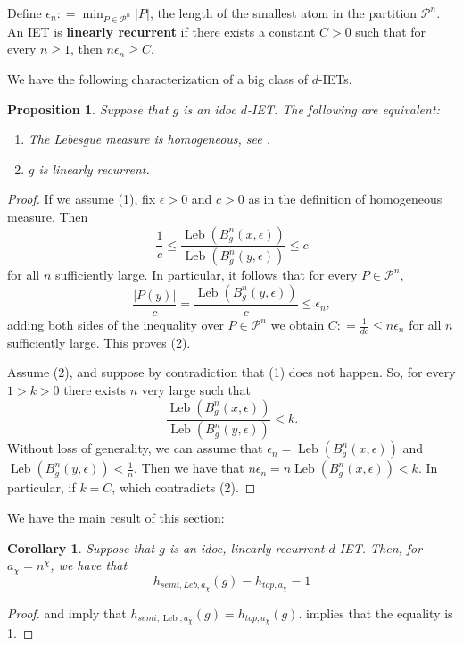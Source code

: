 \documentclass[oneside]{amsart}
\theoremstyle{plain}
\newtheorem{PROP}[THM]{Proposition}
\newtheorem{COR}[THM]{Corollary}
\theoremstyle{definition}
\DeclareMathOperator{\Leb}{Leb}
\newcommand{\dfn}{\mathrel{\mathop:}=}
\newcommand{\<}{\langle}
\renewcommand{\>}{\rangle}
\renewcommand{\P}{\mathcal{P}}
\newcommand{\e}{\epsilon}
\renewcommand{\|}{|\!|} %
\begin{document}
Define $\e_n \dfn \min_{P\in \P^n}|P|$, the length of the smallest atom in the partition $\P^n.$ An IET is  {\bf linearly recurrent} if there exists a constant $C>0$ such that  for every $n\geq 1$, then $n\e_n \geq C.$

We have the following characterization of a big class of $d$-IETs.

\begin{PROP}
\label{prop:LRequalHomog}
    Suppose that $g$ is an idoc $d$-IET. The following are equivalent:
    \begin{enumerate}
        \item The Lebesgue measure is homogeneous, see .
        \item  $g$ is linearly recurrent.
    \end{enumerate}
\end{PROP}
\begin{proof}
    If we assume (1), fix $\e>0$ and  $c>0$ as in the definition of homogeneous measure. Then
    \begin{equation*}
        \frac{1}{c} \leq \frac{\Leb(B^n_g(x,\e))}{\Leb(B^n_g(y,\e))}\leq c
    \end{equation*}
    for all $n$ sufficiently large.
In particular, it follows that for every $P\in\P^n$,
\begin{equation*}
\frac{|P(y)|}{c} = \frac{\Leb(B^n_g(y,\e))}{c}\leq \e_n,
\end{equation*}
adding both sides of the inequality over $P\in\P^n$ we obtain
 $C\dfn \frac{1}{dc} \leq n\e_n$ for all $n$ sufficiently large. This proves (2).

Assume (2), and suppose by contradiction that (1) does not happen. So, for every $1>k>0$ there exists $n$ very large such that 
\begin{equation*}
\frac{\Leb(B^n_g(x,\e))}{\Leb(B^n_g(y,\e))}   < k. 
\end{equation*}
Without loss of generality, we can assume that $\e_n = \Leb(B^n_g(x,\e))$ and $\Leb(B^n_g(y,\e)) < \frac{1}{n}$. Then we have that $n\e_n = n\Leb(B^n_g(x,\e)) < k$. In particular, if $k=C$, which contradicts (2).
\end{proof}
We have the main result of this section:
\begin{COR}
\label{cor:semiequalstop1}
    Suppose that $g$ is an idoc, linearly recurrent $d$-IET. 
    Then, for $a_\chi=n^\chi$, we have that
    \begin{equation}
        h_{semi,Leb,a_\chi}(g)=h_{top,a_\chi} = 1
    \end{equation}
\end{COR}
\begin{proof}
      and   imply that $h_{semi,\Leb,a_\chi}(g)=h_{top,a_\chi}(g)$. 
     implies that the equality is 1.
\end{proof}
\end{document}
